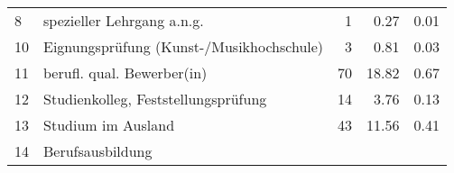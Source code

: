 \begin{longtable}{lXrrr}
     8 &
     \multicolumn{1}{X}{ spezieller Lehrgang a.n.g.   } &


       \num{1} &
       \num[round-mode=places,round-precision=2]{0.27} &
         \num[round-mode=places,round-precision=2]{0.01} \\

     10 &
     \multicolumn{1}{X}{ Eignungsprüfung (Kunst-/Musikhochschule)   } &


       \num{3} &
       \num[round-mode=places,round-precision=2]{0.81} &
         \num[round-mode=places,round-precision=2]{0.03} \\

     11 &
     \multicolumn{1}{X}{ berufl. qual. Bewerber(in)   } &


       \num{70} &
       \num[round-mode=places,round-precision=2]{18.82} &
         \num[round-mode=places,round-precision=2]{0.67} \\

     12 &
     \multicolumn{1}{X}{ Studienkolleg, Feststellungsprüfung   } &


       \num{14} &
       \num[round-mode=places,round-precision=2]{3.76} &
         \num[round-mode=places,round-precision=2]{0.13} \\

     13 &
     \multicolumn{1}{X}{ Studium im Ausland   } &


       \num{43} &
       \num[round-mode=places,round-precision=2]{11.56} &
         \num[round-mode=places,round-precision=2]{0.41} \\

     14 &
     \multicolumn{1}{X}{ Berufsausbildung   } &



\end{longtable}
